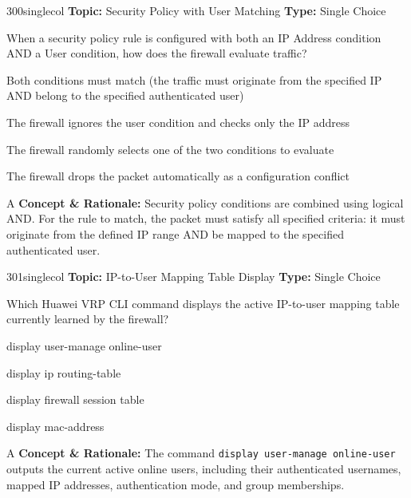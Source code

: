 \begin{qcard}{300}{singlecol}
\textcolor{darkslate!75}{\small\textbf{Topic:} Security Policy with User Matching \hfill \textbf{Type:} Single Choice}\vspace{0.4em}\par
When a security policy rule is configured with both an IP Address condition AND a User condition, how does the firewall evaluate traffic?
\begin{qoptions}
\item Both conditions must match (the traffic must originate from the specified IP AND belong to the specified authenticated user)
\item The firewall ignores the user condition and checks only the IP address
\item The firewall randomly selects one of the two conditions to evaluate
\item The firewall drops the packet automatically as a configuration conflict
\end{qoptions}
\end{qcard}
\nopagebreak
\begin{explainbox}{A}
\textbf{Concept \& Rationale:} Security policy conditions are combined using logical AND. For the rule to match, the packet must satisfy all specified criteria: it must originate from the defined IP range AND be mapped to the specified authenticated user.
\end{explainbox}

\begin{qcard}{301}{singlecol}
\textcolor{darkslate!75}{\small\textbf{Topic:} IP-to-User Mapping Table Display \hfill \textbf{Type:} Single Choice}\vspace{0.4em}\par
Which Huawei VRP CLI command displays the active IP-to-user mapping table currently learned by the firewall?
\begin{qoptions}
\item display user-manage online-user
\item display ip routing-table
\item display firewall session table
\item display mac-address
\end{qoptions}
\end{qcard}
\nopagebreak
\begin{explainbox}{A}
\textbf{Concept \& Rationale:} The command \texttt{display user-manage online-user} outputs the current active online users, including their authenticated usernames, mapped IP addresses, authentication mode, and group memberships.
\end{explainbox}

